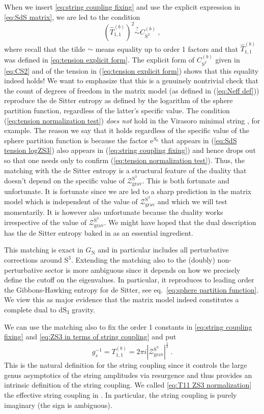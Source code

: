 \documentclass[12pt,a4paper]{article}
\newcommand{\be}{\begin{equation}}
\newcommand{\ee}{\end{equation}}
\begin{document}
When we insert \eqref{eq:string coupling fixing} and use the explicit expression in \eqref{eq:SdS matrix}, we are led to the condition
\be 
(\widehat{T}_{1,1}^{(b)})^2 \overset{?}{\sim} C_{\mathrm{S}^2}^{(b)}~, \label{eq:tension normalization test}
\ee
where recall that the tilde $\sim$ means equality up to order 1 factors and that $\widehat{T}_{1,1}^{(b)}$ was defined in \eqref{eq:tension explicit form}.
The explicit form of $C_{\mathrm{S}^2}^{(b)}$ given in \eqref{eq:CS2} and of the tension in (\ref{eq:tension explicit form}) shows that this equality indeed holds! We want to emphasize that this is a genuinely nontrivial check that the count of degrees of freedom in the matrix model (as defined in (\ref{eq:Neff def})) reproduce the de Sitter entropy as defined by the logarithm of the sphere partition function, regardless of the latter's specific value. The condition (\ref{eq:tension normalization test}) \emph{does not} hold in the Virasoro minimal string \cite{Collier:2023cyw}, for example. The reason we say that it holds regardless of the specific value of the sphere partition function is because the factor $\mathrm{e}^{S_0}$ that appears in (\ref{eq:SdS tension logZS3}) also appears in (\ref{eq:string coupling fixing}) and hence drops out so that one needs only to confirm (\ref{eq:tension normalization test}). Thus, the matching with the de Sitter entropy is a structural feature of the duality that doesn't depend on the specific value of $\mathcal{Z}_{\text{grav}}^{\text{S}^3}$. This is both fortunate and unfortunate. It is fortunate since we are led to a sharp prediction in the matrix model which is independent of the value of $\mathcal{Z}_{\text{grav}}^{\text{S}^3}$ and which we will test momentarily. It is however also unfortunate because the duality works irrespective of the value of $\mathcal{Z}_{\text{grav}}^{\text{S}^3}$. We might have hoped that the dual description has the de Sitter entropy baked in as an essential ingredient. 


This matching is exact in $G_{\text{N}}$ and in particular includes all perturbative corrections around $\mathrm{S}^3$. Extending the matching also to the (doubly) non-perturbative sector is more ambiguous since it depends on how we precisely define the cutoff on the eigenvalues. In particular, it reproduces to leading order the Gibbons-Hawking entropy for de Sitter, see eq.~\eqref{eq:sphere partition function}. We view this as major evidence that the matrix model indeed constitutes a complete dual to $\mathrm{dS}_3$ gravity.

We can use the matching also to fix the order 1 constants in \eqref{eq:string coupling fixing} and \eqref{eq:ZS3 in terms of string coupling} and put
\be 
g_s^{-1}=T_{1,1}^{(b)}=2\pi i |\mathcal{Z}_{\text{grav}}^{\text{S}^3}|^{\frac{1}{2}}~. \label{eq:T11 ZS3 normalization}
\ee
This is the natural definition for the string coupling since it controls the large genus asymptotics of the string amplitudes via resurgence \cite{paper3} and thus provides an intrinsic definition of the string coupling. We called \eqref{eq:T11 ZS3 normalization} the effective string coupling in \cite{paper3}. In particular, the string coupling is purely imaginary (the sign is ambiguous).
\end{document}
